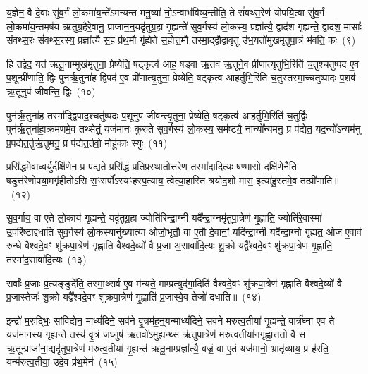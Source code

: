 {\anuvakamend[{ध्रु॒वस्तस्मा॑दे॒व य॒ज्ञस्यैका॒न्नच॑त्वारि॒ꣳ॒शच्च॑}]}%

य॒ज्ञेन॒ वै दे॒वाः सु॑व॒र्गं लो॒कमा॑य॒न्ते॑\-ऽमन्यन्त मनु॒ष्या॑ नो॒\-ऽन्वाभ॑विष्य॒न्तीति॒ ते सं॑वथ्स॒रेण॑ योपयि॒त्वा सु॑व॒र्गं लो॒कमा॑य॒न्तमृष॑य ऋतुग्र॒हैरे॒वानु॒ प्राजा॑न॒न्॒यदृ॑तुग्र॒हा गृ॒ह्यन्ते॑ सुव॒र्गस्य॑ लो॒कस्य॒ प्रज्ञा᳚त्यै॒ द्वाद॑श गृह्यन्ते॒ द्वाद॑श॒ मासाः᳚ संवथ्स॒रः सं॑वथ्स॒रस्य॒ प्रज्ञा᳚त्यै स॒ह प्र॑थ॒मौ गृ॑ह्येते स॒होत्त॒मौ तस्मा॒द्द्वौद्वा॑वृ॒तू उ॑भ॒यतो॑मुखमृतुपा॒त्रं भ॑वति॒ कः~(९)

हि तद्वेद॒ यत॑ ऋतू॒नाम्मुख॑मृ॒तुना॒ प्रेष्येति॒ षट्कृत्व॑ आह॒ षड्वा ऋ॒तव॑ ऋ॒तूने॒व प्री॑णात्यृ॒तुभि॒रिति॑ च॒तुश्चतु॑ष्पद ए॒व प॒शून्प्री॑णाति॒ द्विः पुन॑र्\mbox{}ऋ॒तुना॑ह द्वि॒पद॑ ए॒व प्री॑णात्यृ॒तुना॒ प्रेष्येति॒ षट्कृत्व॑ आह॒र्तुभि॒रिति॑ च॒तुस्तस्मा॒च्चतु॑ष्पादः प॒शव॑ ऋ॒तूनुप॑ जीवन्ति॒ द्विः~(१०)

पुन॑र्\mbox{}ऋ॒तुना॑ह॒ तस्मा᳚द्द्वि॒पाद॒श्चतु॑ष्पदः प॒शूनुप॑ जीवन्त्यृ॒तुना॒ प्रेष्येति॒ षट्कृत्व॑ आह॒र्तुभि॒रिति॑ च॒तुर्द्विः पुन॑र्\mbox{}ऋ॒तुना॑हा॒क्रम॑णमे॒व तथ्सेतुं॒ यज॑मानः कुरुते सुव॒र्गस्य॑ लो॒कस्य॒ सम॑ष्ट्यै॒ नान्यो᳚न्यमनु॒ प्र प॑द्येत॒ यद॒न्यो᳚\-ऽन्यम॑नु प्र॒पद्ये॑त॒र्तुर्\mbox{}ऋ॒तुमनु॒ प्र प॑द्येत॒र्तवो॒ मोहु॑काः स्युः~(११)

प्रसि॑द्धमे॒वाध्व॒र्युर्दक्षि॑णेन॒ प्र प॑द्यते॒ प्रसि॑द्धं प्रतिप्रस्था॒तोत्त॑रेण॒ तस्मा॑दादि॒त्यः षण्मा॒सो दक्षि॑णेनैति॒ षडुत्त॑रेणोपया॒मगृ॑हीतो\-ऽसि स॒ꣳ॒सर्पो᳚\-ऽस्यꣳहस्प॒त्याय॒ त्वेत्या॒हास्ति॑ त्रयोद॒शो मास॒ इत्या॑हु॒स्तमे॒व तत्प्री॑णाति॥~(१२)

{\anuvakamend[{को जी॑वन्ति॒ द्विः स्यु॒श्चतु॑स्त्रिꣳशच्च}]}%

सु॒व॒र्गाय॒ वा ए॒ते लो॒काय॑ गृह्यन्ते॒ यदृ॑तुग्र॒हा ज्योति॑रिन्द्रा॒ग्नी यदै᳚न्द्रा॒ग्नमृ॑तुपा॒त्रेण॑ गृ॒ह्णाति॒ ज्योति॑रे॒वास्मा॑ उ॒परि॑ष्टाद्दधाति सुव॒र्गस्य॑ लो॒कस्यानु॑ख्यात्या ओजो॒भृतौ॒ वा ए॒तौ दे॒वानां॒ यदि॑न्द्रा॒ग्नी यदै᳚न्द्रा॒ग्नो गृ॒ह्यत॒ ओज॑ ए॒वाव॑ रुन्धे वैश्वदे॒वꣳ शु॑क्रपा॒त्रेण॑ गृह्णाति वैश्वदे॒व्यो॑ वै प्र॒जा अ॒सावा॑दि॒त्यः शु॒क्रो यद्वै᳚श्वदे॒वꣳ शु॑क्रपा॒त्रेण॑ गृ॒ह्णाति॒ तस्मा॑द॒सावा॑दि॒त्यः~(१३)

सर्वाः᳚ प्र॒जाः प्र॒त्यङ्ङुदे॑ति॒ तस्मा॒थ्सर्व॑ ए॒व म॑न्यते॒ माम्प्रत्युद॑गा॒दिति॑ वैश्वदे॒वꣳ शु॑क्रपा॒त्रेण॑ गृह्णाति वैश्वदे॒व्यो॑ वै प्र॒जास्तेजः॑ शु॒क्रो यद्वै᳚श्वदे॒वꣳ शु॑क्रपा॒त्रेण॑ गृ॒ह्णाति॑ प्र॒जास्वे॒व तेजो॑ दधाति॥~(१४)

{\anuvakamend[{तस्मा॑द॒सावा॑दि॒त्यस्त्रि॒ꣳ॒शच्च॑}]}%

इन्द्रो॑ म॒रुद्भिः॒ सांवि॑द्येन॒ माध्यं॑दिने॒ सव॑ने वृ॒त्रम॑ह॒न्॒यन्माध्यं॑दिने॒ सव॑ने मरुत्व॒तीया॑ गृ॒ह्यन्ते॒ वार्त्र॑घ्ना ए॒व ते यज॑मानस्य गृह्यन्ते॒ तस्य॑ वृ॒त्रं ज॒घ्नुष॑ ऋ॒तवो॑\-ऽमुह्य॒न्थ्स ऋ॑तुपा॒त्रेण॑ मरुत्व॒तीया॑नगृह्णा॒त्ततो॒ वै स ऋ॒तून्प्राजा॑ना॒द्यदृ॑तुपा॒त्रेण॑ मरुत्व॒तीया॑ गृ॒ह्यन्त॑ ऋतू॒नाम्प्रज्ञा᳚त्यै॒ वज्रं॒ वा ए॒तं यज॑मानो॒ भ्रातृ॑व्याय॒ प्र ह॑रति॒ यन्म॑रुत्व॒तीया॒ उदे॒व प्र॑थ॒मेन॑~(१५)

